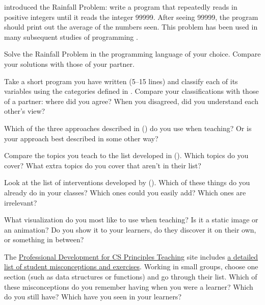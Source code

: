 
\cite{Solo1986} introduced the Rainfall Problem: write a program that
repeatedly reads in positive integers until it reads the integer
99999. After seeing 99999, the program should print out the average of
the numbers seen.  This problem has been used in many subsequent
studies of programming \cite{Fisl2014,Simo2013,Sepp2015}.

Solve the Rainfall Problem in the programming language of your
choice. Compare your solutions with those of your partner.


Take a short program you have written (5--15 lines) and classify each
of its variables using the categories defined in
.  Compare your classifications with those
of a partner: where did you agree? When you disagreed, did you
understand each other's view?


Which of the three approaches described in \cite{Sorv2014}
() do you use when teaching? Or is your approach
best described in some other way?


Compare the topics you teach to the list developed in \cite{Luxt2017}
().  Which topics do you cover?  What extra topics
do you cover that aren't in their list?


Look at the list of interventions developed by \cite{Viha2014}
().  Which of these things do you already do in
your classes?  Which ones could you easily add?  Which ones are
irrelevant?


What visualization do you most like to use when teaching?  Is it a
static image or an animation?  Do you show it to your learners, do
they discover it on their own, or something in between?


The \href{http://www.pd4cs.org/}{Professional Development for CS
  Principles Teaching} site includes
\href{http://www.pd4cs.org/mc-index/}{a detailed list of student
  misconceptions and exercises}.  Working in small groups, choose one
section (such as data structures or functions) and go through their
list.  Which of these misconceptions do you remember having when you
were a learner?  Which do you still have?  Which have you seen in your
learners?
